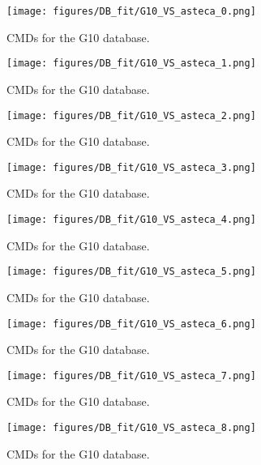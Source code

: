 \documentclass{aa}
\begin{document}
\begin{appendix}
\begin{figure*}
\texttt{[image: figures/DB\_fit/G10\_VS\_asteca\_0.png]}
\caption{CMDs for the G10 database.}
\label{fig:DBs_G10_0}
\end{figure*}
\clearpage

\begin{figure*}
\texttt{[image: figures/DB\_fit/G10\_VS\_asteca\_1.png]}
\caption{CMDs for the G10 database.}
\label{fig:DBs_G10_1}
\end{figure*}
\clearpage

\begin{figure*}
\texttt{[image: figures/DB\_fit/G10\_VS\_asteca\_2.png]}
\caption{CMDs for the G10 database.}
\label{fig:DBs_G10_2}
\end{figure*}
\clearpage

\begin{figure*}
\texttt{[image: figures/DB\_fit/G10\_VS\_asteca\_3.png]}
\caption{CMDs for the G10 database.}
\label{fig:DBs_G10_3}
\end{figure*}
\clearpage

\begin{figure*}
\texttt{[image: figures/DB\_fit/G10\_VS\_asteca\_4.png]}
\caption{CMDs for the G10 database.}
\label{fig:DBs_G10_4}
\end{figure*}
\clearpage

\begin{figure*}
\texttt{[image: figures/DB\_fit/G10\_VS\_asteca\_5.png]}
\caption{CMDs for the G10 database.}
\label{fig:DBs_G10_5}
\end{figure*}
\clearpage

\begin{figure*}
\texttt{[image: figures/DB\_fit/G10\_VS\_asteca\_6.png]}
\caption{CMDs for the G10 database.}
\label{fig:DBs_G10_6}
\end{figure*}
\clearpage

\begin{figure*}
\texttt{[image: figures/DB\_fit/G10\_VS\_asteca\_7.png]}
\caption{CMDs for the G10 database.}
\label{fig:DBs_G10_7}
\end{figure*}
\clearpage

\begin{figure}
\centering
\texttt{[image: figures/DB\_fit/G10\_VS\_asteca\_8.png]}
\caption{CMDs for the G10 database.}
\label{fig:DBs_G10_8}
\end{figure}





\end{appendix}
\end{document}
